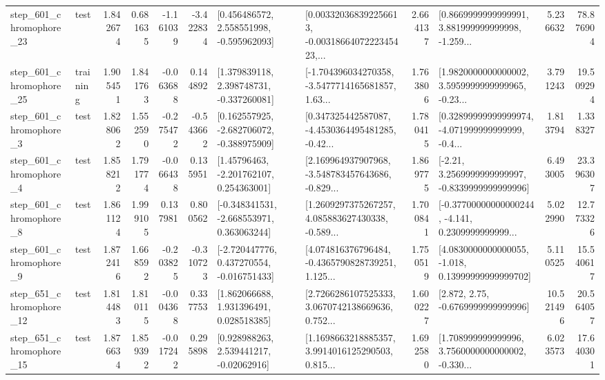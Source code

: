 \begin{tabular}{llrrrrllrlrr}
  step\_601\_chromophore\_23 &      test &      1.842674 &    0.681635 &     -1.161039 & -3.422834 &    [0.456486572, 2.558551998, -0.595962093] &  [0.003320368392256613, -0.0031866407222345423,... &       2.664137 &  [0.8669999999999991, 3.881999999999998, -1.259... &            5.236632 &         78.876904 \\
  step\_601\_chromophore\_25 &  training &      1.905451 &    1.841763 &     -0.063688 &  0.144892 &    [1.379839118, 2.398748731, -0.337260081] &  [-1.704396034270358, -3.5477714165681857, 1.63... &       1.763806 &  [1.9820000000000002, 3.5959999999999965, -0.23... &            3.791243 &         19.509294 \\
   step\_601\_chromophore\_3 &      test &      1.828062 &    1.552590 &     -0.275472 & -0.543662 &   [0.162557925, -2.682706072, -0.388975909] &  [0.347325442587087, -4.4530364495481285, -0.42... &       1.780415 &  [0.32899999999999974, -4.071999999999999, -0.4... &            1.813794 &          1.338327 \\
   step\_601\_chromophore\_4 &      test &      1.858212 &    1.791774 &     -0.066438 &  0.135951 &     [1.45796463, -2.201762107, 0.254363001] &  [2.169964937907968, -3.548783457643686, -0.829... &       1.869775 &   [-2.21, 3.2569999999999997, -0.8339999999999996] &            6.493005 &         23.396307 \\
   step\_601\_chromophore\_8 &      test &      1.861124 &    1.999105 &      0.137981 &  0.800562 &   [-0.348341531, -2.668553971, 0.363063244] &  [1.2609297375267257, 4.085883627430338, -0.589... &       1.700841 &  [-0.37700000000000244, -4.141, 0.2309999999999... &            5.022990 &         12.773326 \\
   step\_601\_chromophore\_9 &      test &      1.872416 &    1.668592 &     -0.203825 & -0.310723 &   [-2.720447776, 0.437270554, -0.016751433] &  [4.074816376796484, -0.4365790828739251, 1.125... &       1.750519 &  [4.0830000000000055, -1.018, 0.13999999999999702] &            5.110525 &         15.540617 \\
  step\_651\_chromophore\_12 &      test &      1.814483 &    1.810115 &     -0.004368 &  0.337753 &     [1.862066688, 1.931396491, 0.028518385] &  [2.7266286107525333, 3.0670742138669636, 0.752... &       1.600227 &                 [2.872, 2.75, -0.6769999999999996] &           10.521496 &         20.564057 \\
  step\_651\_chromophore\_15 &      test &      1.876634 &    1.859392 &     -0.017242 &  0.295898 &     [0.928988263, 2.539441217, -0.02062916] &  [1.1698663218885357, 3.9914016125290503, 0.815... &       1.692580 &  [1.708999999999996, 3.7560000000000002, -0.330... &            6.023573 &         17.640301 \\

\end{tabular}

